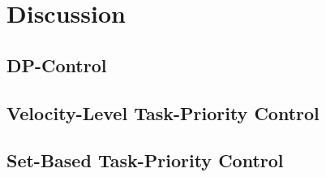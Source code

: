 \chapter{Discussion}

\section{DP-Control}

\section{Velocity-Level Task-Priority Control}

\section{Set-Based Task-Priority Control}

